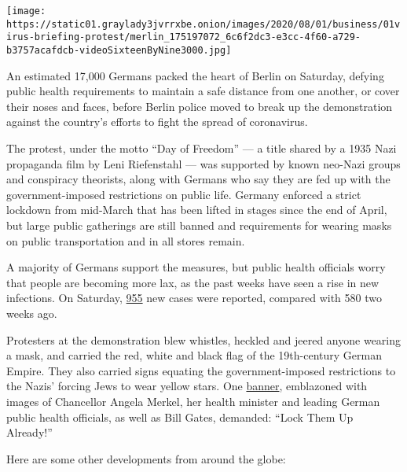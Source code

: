 \texttt{[image: https://static01.graylady3jvrrxbe.onion/images/2020/08/01/business/01virus-briefing-protest/merlin\_175197072\_6c6f2dc3-e3cc-4f60-a729-b3757acafdcb-videoSixteenByNine3000.jpg]}

An estimated 17,000 Germans packed the heart of Berlin on Saturday,
defying public health requirements to maintain a safe distance from one
another, or cover their noses and faces, before Berlin police moved to
break up the demonstration against the country's efforts to fight the
spread of coronavirus.

The protest, under the motto ``Day of Freedom'' --- a title shared by a
1935 Nazi propaganda film by Leni Riefenstahl --- was supported by known
neo-Nazi groups and conspiracy theorists, along with Germans who say
they are fed up with the government-imposed restrictions on public life.
Germany enforced a strict lockdown from mid-March that has been lifted
in stages since the end of April, but large public gatherings are still
banned and requirements for wearing masks on public transportation and
in all stores remain.

A majority of Germans support the measures, but public health officials
worry that people are becoming more lax, as the past weeks have seen a
rise in new infections. On Saturday,
\href{https://www.rki.de/DE/Content/InfAZ/N/Neuartiges_Coronavirus/Situationsberichte/2020-08-01-en.pdf?__blob=publicationFile}{955}
new cases were reported, compared with 580 two weeks ago.

Protesters at the demonstration blew whistles, heckled and jeered anyone
wearing a mask, and carried the red, white and black flag of the
19th-century German Empire. They also carried signs equating the
government-imposed restrictions to the Nazis' forcing Jews to wear
yellow stars. One
\href{https://twitter.com/BenjAlvarez1/status/1289490832815345665/photo/1}{banner},
emblazoned with images of Chancellor Angela Merkel, her health minister
and leading German public health officials, as well as Bill Gates,
demanded: ``Lock Them Up Already!''

Here are some other developments from around the globe:

